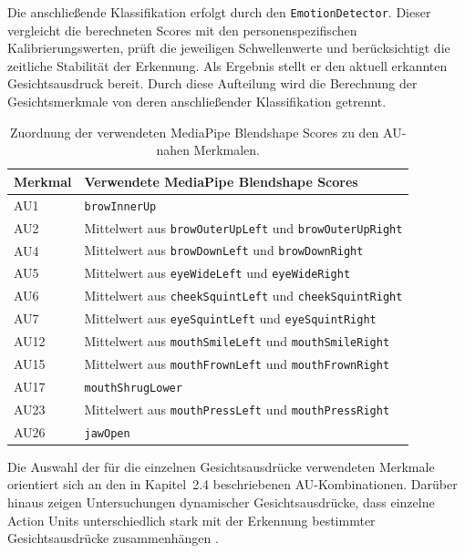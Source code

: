 \documentclass[intern]{cgMA}
\begin{document}
Die anschließende Klassifikation erfolgt durch den
\texttt{EmotionDetector}. Dieser vergleicht die berechneten Scores mit
den personenspezifischen Kalibrierungswerten, prüft die jeweiligen
Schwellenwerte und berücksichtigt die zeitliche Stabilität der
Erkennung. Als Ergebnis stellt er den aktuell erkannten
Gesichtsausdruck bereit. Durch diese Aufteilung wird die Berechnung der
Gesichtsmerkmale von deren anschließender Klassifikation getrennt.\\
\begin{table}[H]
    \centering
    \caption{Zuordnung der verwendeten MediaPipe Blendshape Scores zu den AU-nahen Merkmalen.}
    \label{tab:emotion_features}
    \begin{tabular}{ll}
        \toprule
        \textbf{Merkmal} & \textbf{Verwendete MediaPipe Blendshape Scores} \\
        \midrule
        AU1  & \texttt{browInnerUp} \\
        AU2  & Mittelwert aus \texttt{browOuterUpLeft} und \texttt{browOuterUpRight} \\
        AU4  & Mittelwert aus \texttt{browDownLeft} und \texttt{browDownRight} \\
        AU5  & Mittelwert aus \texttt{eyeWideLeft} und \texttt{eyeWideRight} \\
        AU6  & Mittelwert aus \texttt{cheekSquintLeft} und \texttt{cheekSquintRight} \\
        AU7  & Mittelwert aus \texttt{eyeSquintLeft} und \texttt{eyeSquintRight} \\
        AU12 & Mittelwert aus \texttt{mouthSmileLeft} und \texttt{mouthSmileRight} \\
        AU15 & Mittelwert aus \texttt{mouthFrownLeft} und \texttt{mouthFrownRight} \\
        AU17 & \texttt{mouthShrugLower} \\
        AU23 & Mittelwert aus \texttt{mouthPressLeft} und \texttt{mouthPressRight} \\
        AU26 & \texttt{jawOpen} \\
        \bottomrule
    \end{tabular}
\end{table}
Die Auswahl der für die einzelnen Gesichtsausdrücke verwendeten
Merkmale orientiert sich an den in Kapitel~2.4 beschriebenen
AU-Kombinationen. Darüber hinaus zeigen Untersuchungen dynamischer
Gesichtsausdrücke, dass einzelne Action Units unterschiedlich stark
mit der Erkennung bestimmter Gesichtsausdrücke zusammenhängen
\cite{calvo2018kdefdyn}.\\
\end{document}

